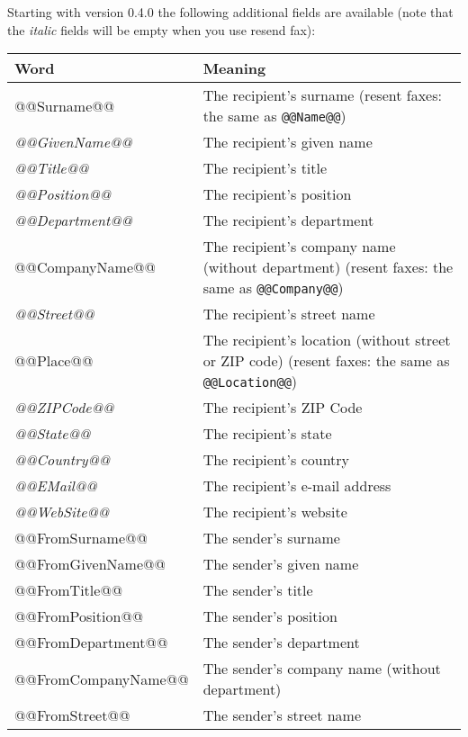 \documentclass[a4paper,10pt]{scrartcl}
\begin{document}
Starting with version 0.4.0 the following additional fields are available (note that the \textit{italic} fields will be empty when you use resend fax):
\begin{center}
\begin{tabular}{|l|p{}|}
\hline
\bfseries Word & \bfseries Meaning \\
\hline\hline
\ttfamily @@Surname@@ & The recipient's surname (resent faxes: the same as \texttt{@@Name@@}) \\\hline
\ttfamily\itshape @@GivenName@@ & The recipient's given name \\\hline
\ttfamily\itshape @@Title@@ & The recipient's title \\\hline
\ttfamily\itshape @@Position@@ & The recipient's position \\\hline
\ttfamily\itshape @@Department@@ & The recipient's department\\\hline
\ttfamily @@CompanyName@@ & The recipient's company name (without department) (resent faxes: the same as \texttt{@@Company@@})\\\hline
\ttfamily\itshape @@Street@@ & The recipient's street name \\\hline
\ttfamily @@Place@@ & The recipient's location (without street or ZIP code) (resent faxes: the same as \texttt{@@Location@@})\\\hline
\ttfamily\itshape @@ZIPCode@@ & The recipient's ZIP Code \\\hline
\ttfamily\itshape @@State@@ & The recipient's state\\\hline
\ttfamily\itshape @@Country@@ & The recipient's country\\\hline
\ttfamily\itshape @@EMail@@ & The recipient's e-mail address\\\hline
\ttfamily\itshape @@WebSite@@ & The recipient's website\\\hline\hline
\ttfamily @@FromSurname@@ & The sender's  surname \\\hline
\ttfamily @@FromGivenName@@ & The sender's  given name \\\hline
\ttfamily @@FromTitle@@ & The sender's  title \\\hline
\ttfamily @@FromPosition@@ & The sender's position \\\hline
\ttfamily @@FromDepartment@@ & The sender's  department\\\hline
\ttfamily @@FromCompanyName@@ & The sender's  company name (without department)\\\hline
\ttfamily @@FromStreet@@ & The sender's  street name \\\hline

\end{tabular}
\end{center}
\end{document}
